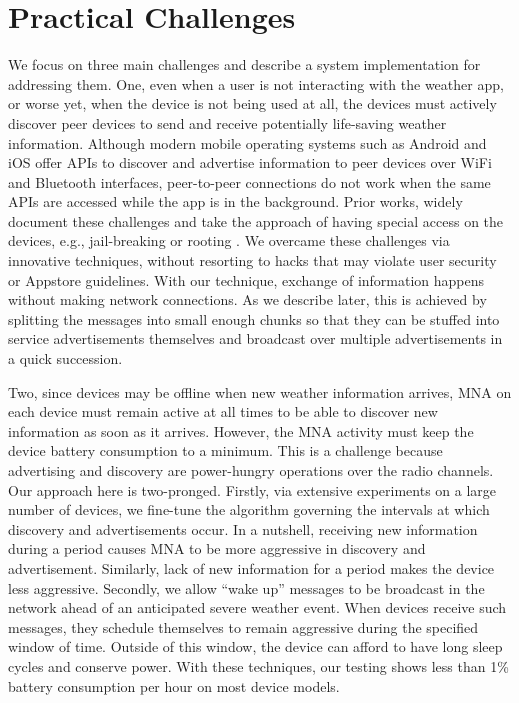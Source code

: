 \documentclass[conference]{IEEEtran}
\begin{document}
\section{Practical Challenges}
We focus on three main challenges and describe a system implementation for addressing them. One, even when a user is not interacting with the weather app, or worse yet, when the device is not being used at all, the devices must actively discover peer devices to send and receive potentially life-saving weather information. Although modern mobile operating systems such as Android and iOS offer APIs to discover and advertise information to peer devices over WiFi and Bluetooth interfaces, peer-to-peer connections do not work when the same APIs are accessed while the app is in the background. Prior works, widely document these challenges and take the approach of having special access on the devices, e.g., jail-breaking or rooting \cite{}. We overcame these challenges via innovative techniques, without resorting to hacks that may violate user security or Appstore guidelines. With our technique, exchange of information happens without making network connections. As we describe later, this is achieved by splitting the messages into small enough chunks so that they can be stuffed into service advertisements themselves and broadcast over multiple advertisements in a quick succession.

Two, since devices may be offline when new weather information arrives, MNA on each device must remain active at all times to be able to discover new information as soon as it arrives. However, the MNA activity must keep the device battery consumption to a minimum. This is a challenge because advertising and discovery are power-hungry operations over the radio channels. Our approach here is two-pronged. Firstly, via extensive experiments on a large number of devices, we fine-tune the algorithm governing the intervals at which discovery and advertisements occur. In a nutshell, receiving new information during a period causes MNA to be more aggressive in discovery and advertisement. Similarly, lack of new information for a period makes the device less aggressive. Secondly, we allow ``wake up'' messages to be broadcast in the network ahead of an anticipated severe weather event. When devices receive such messages, they schedule themselves to remain aggressive during the specified window of time. Outside of this window, the device can afford to have long sleep cycles and conserve power. With these techniques, our testing shows less than 1\% battery consumption per hour on most device models.
\end{document}
